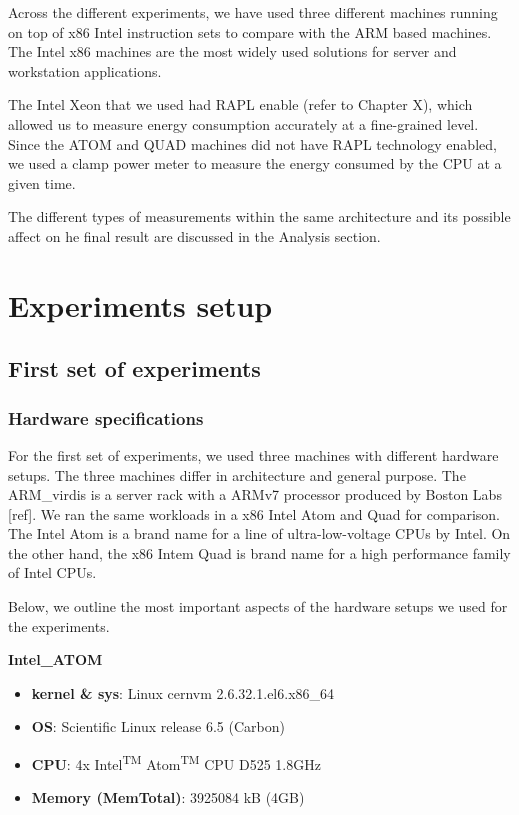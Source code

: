 Across the different experiments, we have used three different machines running
on top of x86 Intel instruction sets to
compare with the ARM based machines. The Intel x86 machines are the most widely
used solutions for server and workstation applications.

The Intel Xeon that we used had RAPL enable (refer to Chapter X), which allowed us to measure energy
consumption accurately at a fine-grained level. Since the ATOM and QUAD machines
did not have RAPL technology enabled, we used a clamp power meter to measure the
energy consumed by the CPU at a given time.

The different types of measurements within the same architecture and
its possible affect on he final result are discussed in the Analysis section.

\clearpage


\section{Experiments setup}
\subsection{First set of experiments}

\subsubsection*{Hardware specifications}
For the first set of experiments, we used three machines with different hardware setups. The three machines differ in architecture and general purpose. The ARM\_virdis is a server rack with a ARMv7 processor produced by Boston Labs [ref]. We ran the same workloads in a x86 Intel Atom and Quad for comparison. The Intel Atom is a brand name for a line of ultra-low-voltage CPUs by Intel. On the other hand, the x86 Intem Quad is brand name for a high performance family of Intel CPUs.

Below, we outline the most important aspects of the hardware setups we used for the experiments.

\vspace{10mm}
\textbf{Intel\_ATOM}
\begin{itemize}
  \item[] \textbf{kernel \& sys}:  Linux cern\-vm 2.6.32.1.el6.x86\_64
  \item[] \textbf{OS}: Scientific Linux release 6.5 (Carbon)
  \item[] \textbf{CPU}:   4x Intel\textsuperscript{TM} Atom\textsuperscript{TM} CPU D525 \@ 1.8GHz
  \item[] \textbf{Memory  (MemTotal)}:        3925084  kB (4GB)
\end{itemize}

